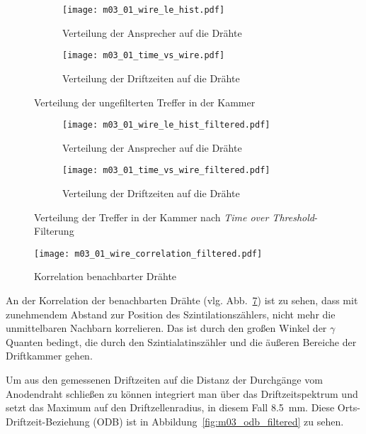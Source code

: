 \documentclass[11pt, ngerman, fleqn, DIV=15, headinclude, BCOR=2cm]{scrreprt}
\begin{document}
\begin{figure}
	\centering
	\begin{subfigure}{0.49 \linewidth}
		\texttt{[image: m03\_01\_wire\_le\_hist.pdf]}
		\caption{%
			Verteilung der Ansprecher auf die Drähte
		}
		\label{fig:m03_wire_le_hist_filtered}
	\end{subfigure}
	\begin{subfigure}{0.49 \linewidth}
		\texttt{[image: m03\_01\_time\_vs\_wire.pdf]}
		\caption{%
			Verteilung der Driftzeiten auf die Drähte
		}
		\label{fig:m03_time_vs_wire_filtered}
	\end{subfigure}
	\caption{%
		Verteilung der ungefilterten Treffer in der Kammer
	}
	\label{fig:m03_verteilung_in_der_kammer}
\end{figure}

\begin{figure}
	\centering
	\begin{subfigure}{0.49 \linewidth}
		\texttt{[image: m03\_01\_wire\_le\_hist\_filtered.pdf]}
		\caption{%
			Verteilung der Ansprecher auf die Drähte
		}
		\label{fig:m03_wire_le_hist_filtered}
	\end{subfigure}
	\begin{subfigure}{0.49 \linewidth}
		\texttt{[image: m03\_01\_time\_vs\_wire\_filtered.pdf]}
		\caption{%
			Verteilung der Driftzeiten auf die Drähte
		}
		\label{fig:m03_time_vs_wire_filtered}
	\end{subfigure}
	\caption{%
		Verteilung der Treffer in der Kammer nach \emph{Time over
		Threshold}-Filterung
	}
	\label{fig:m03_verteilung_in_der_kammer_mit_ToT}
\end{figure}

\begin{figure}
	\centering
	\texttt{[image: m03\_01\_wire\_correlation\_filtered.pdf]}
	\caption{%
		Korrelation benachbarter Drähte
	}
	\label{fig:m03_wire_correlation}
\end{figure}

An der Korrelation der benachbarten Drähte (vlg. 
Abb.~\ref{fig:m03_wire_correlation}) ist zu sehen, dass mit zunehmendem Abstand
zur Position des Szintilationszählers, nicht mehr die unmittelbaren Nachbarn
korrelieren.
Das ist durch den großen Winkel der $\gamma$ Quanten bedingt, die durch den
Szintialatinszähler und die äußeren Bereiche der Driftkammer gehen.

Um aus den gemessenen Driftzeiten auf die Distanz der Durchgänge vom
Anodendraht schließen zu können integriert man über das Driftzeitspektrum und
setzt das Maximum auf den Driftzellenradius, in diesem Fall
\SI{8.5}{\milli\metre}. Diese Orts-Driftzeit-Beziehung (ODB) ist in
Abbildung~\ref{fig:m03_odb_filtered} zu sehen.
\end{document}
